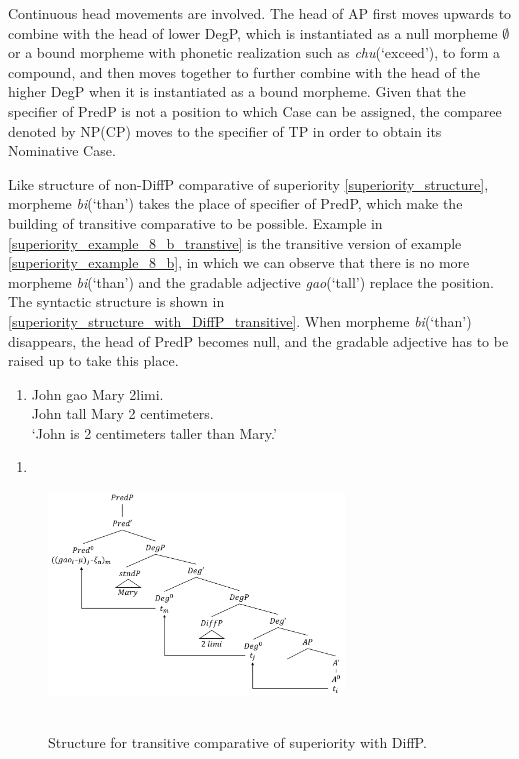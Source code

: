 \documentclass{ctexart}
\begin{document}
Continuous head movements are involved. The head of AP first moves upwards to combine with the head of lower DegP, which is instantiated as a null morpheme $\emptyset$ or a bound morpheme with phonetic realization such as \textit{chu}(`exceed'), to form a compound, and then moves together to further combine with the head of the higher DegP when it is instantiated as a bound morpheme. Given that the specifier of PredP is not a position to which Case can be assigned, the comparee denoted by NP(CP) moves to the specifier of TP in order to obtain its Nominative Case.

Like structure of non-DiffP comparative of superiority \ref{superiority_structure}, morpheme \textit{bi}(`than') takes the place of specifier of PredP, which make the building of transitive comparative to be possible. Example in \ref{superiority_example_8_b_transtive} is the transitive version of example \ref{superiority_example_8_b}, in which we can observe that there is no more morpheme \textit{bi}(`than') and the gradable adjective \textit{gao}(`tall') replace the position. The syntactic structure is shown in \ref{superiority_structure_with_DiffP_transitive}. When morpheme \textit{bi}(`than') disappears, the head of PredP becomes null, and the gradable adjective has to be raised up to take this place. 

\begin{enumerate}
    \item \label{superiority_example_8_b_transtive}
    John gao Mary \enspace \enspace \enspace 2limi. \\
    John tall Mary 2 centimeters.  \\
    `John is 2 centimeters taller than Mary.'
\end{enumerate}

\begin{enumerate}
    \item \label{superiority_structure_with_DiffP_transitive}
\end{enumerate}

\begin{figure}[H]
    \centering
    \includegraphics[width=0.7\textwidth]{pic/superiority_structure_diff_transitive.png}
    \begin{caption}
        \\ \vspace{-1.1ex}
        Structure for transitive comparative of superiority with DiffP.
    \end{caption}
\end{figure}
\end{document}
